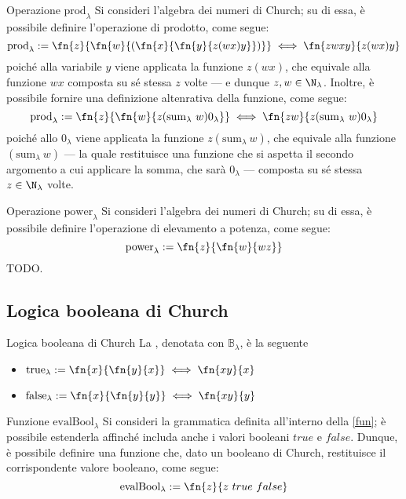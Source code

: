 \documentclass[a4paper, 12pt]{report}
\begin{document}
    \begin{framedprop}{Operazione $\mathrm{prod}_\lambda$}
        Si consideri l'algebra dei numeri di Church; su di essa, è possibile definire l'operazione di prodotto, come segue: $$\mathrm{prod}_\lambda := \fn{z}{\fn{w}{(\fn{x}{\fn{y}{z(wx)y}})}} \iff \fn{zwxy}{z(wx)y}$$ poiché alla variabile $y$ viene applicata la funzione $z(wx)$, che equivale alla funzione $wx$ composta su sé stessa $z$ volte --- e dunque $z, w \in \N_\lambda$. Inoltre, è possibile fornire una definizione altenrativa della funzione, come segue: $$\mathrm{prod}_\lambda := \fn{z}{\fn{w}{z (\mathrm{sum}_\lambda \ w)0_\lambda}} \iff \fn{zw}{z(\mathrm{sum}_\lambda \ w)0_\lambda}$$ poiché allo $0_\lambda$ viene applicata la funzione $z(\mathrm{sum}_\lambda \ w)$, che equivale alla funzione $(\mathrm{sum}_\lambda \ w)$ --- la quale restituisce una funzione che si aspetta il secondo argomento a cui applicare la somma, che sarà $0_\lambda$ --- composta su sé stessa $z \in \N_\lambda$ volte.
    \end{framedprop}

    \begin{framedprop}{Operazione $\mathrm{power}_\lambda$}
        Si consideri l'algebra dei numeri di Church; su di essa, è possibile definire l'operazione di elevamento a potenza, come segue: $$\mathrm{power}_\lambda := \fn{z}{\fn{w}{wz}}$$ TODO.
    \end{framedprop}

    \subsection{Logica booleana di Church}

    \begin{frameddefn}{Logica booleana di Church}
        La , denotata con $\mathbb{B}_\lambda$, è la seguente

        \begin{itemize}
            \item $\mathrm{true}_\lambda := \fn{x}{\fn{y}{x}} \iff \fn{xy}{x}$
            \item $\mathrm{false}_\lambda := \fn{x}{\fn{y}{y}} \iff \fn{xy}{y}$
        \end{itemize}
    \end{frameddefn}

    \begin{framedprop}{Funzione $\mathrm{evalBool}_\lambda$}
        Si consideri la grammatica definita all'interno della \cref{fun}; è possibile estenderla affinché includa anche i valori booleani $true$ e $false$. Dunque, è possibile definire una funzione che, dato un booleano di Church, restituisce il corrispondente valore booleano, come segue: $$\mathrm{evalBool}_\lambda := \fn{z}{z \ true \ false}$$
    \end{framedprop}
\end{document}
